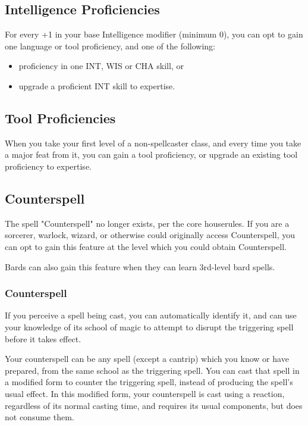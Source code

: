 \documentclass[letterpaper,twocolumn,openany,nodeprecatedcode,bg=print]{dndbook}
\begin{document}
\subsection{Intelligence Proficiencies}
For every +1 in your base Intelligence modifier (minimum 0), 
you can opt to gain one language or tool proficiency, and one of the following:
\begin{itemize}
    \item proficiency in one INT, WIS or CHA skill, or
    \item upgrade a proficient INT skill to expertise.
\end{itemize}

\subsection{Tool Proficiencies}
When you take your first level of a non-spellcaster class, and every time you take a major feat from it, 
you can gain a tool proficiency, or upgrade an existing tool proficiency to expertise. 

\subsection{Counterspell}
\label{counterspell}
The spell "Counterspell" no longer exists, per the core houserules.
If you are a sorcerer, warlock, wizard, or otherwise could originally access Counterspell,
you can opt to gain this feature at the level which you could obtain Counterspell.

Bards can also gain this feature when they can learn 3rd-level bard spells.

\subsubsection{Counterspell}
If you perceive a spell being cast, 
you can automatically identify it, 
and can use your knowledge of its school of magic to attempt to disrupt the triggering spell before it takes effect.

Your counterspell can be any spell (except a cantrip) which you know or have prepared, from the same school as the triggering spell.
You can cast that spell in a modified form to counter the triggering spell, instead of producing the spell's usual effect. 
In this modified form, your counterspell is cast using a reaction, regardless of its normal casting time, 
and requires its usual components, but does not consume them.
\end{document}
